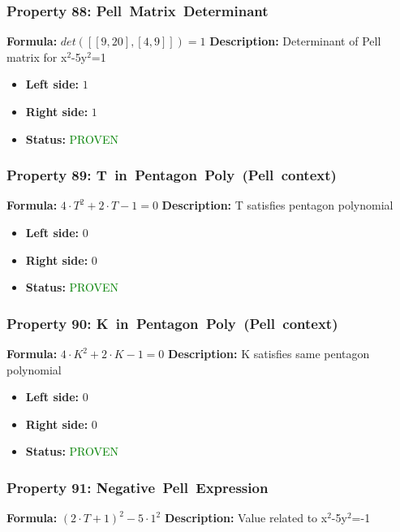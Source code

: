\subsubsection*{Property 88: Pell~Matrix~Determinant}
\textbf{Formula:} $det([[9,20],[4,9]]) = 1$
\textbf{Description:} Determinant of Pell matrix for x$^2$-5y$^2$=1

\begin{itemize}
\item \textbf{Left side:} $1$
\item \textbf{Right side:} $1$
\item \textbf{Status:} \textcolor{green}{PROVEN}
\end{itemize}

\subsubsection*{Property 89: T~in~Pentagon~Poly~(Pell~context)}
\textbf{Formula:} $4 \cdot T^2 + 2 \cdot T - 1 = 0$
\textbf{Description:} T satisfies pentagon polynomial

\begin{itemize}
\item \textbf{Left side:} $0$
\item \textbf{Right side:} $0$
\item \textbf{Status:} \textcolor{green}{PROVEN}
\end{itemize}

\subsubsection*{Property 90: K~in~Pentagon~Poly~(Pell~context)}
\textbf{Formula:} $4 \cdot K^2 + 2 \cdot K - 1 = 0$
\textbf{Description:} K satisfies same pentagon polynomial

\begin{itemize}
\item \textbf{Left side:} $0$
\item \textbf{Right side:} $0$
\item \textbf{Status:} \textcolor{green}{PROVEN}
\end{itemize}

\subsubsection*{Property 91: Negative~Pell~Expression}
\textbf{Formula:} $(2 \cdot T+1)^2 - 5 \cdot 1^2$
\textbf{Description:} Value related to x$^2$-5y$^2$=-1


